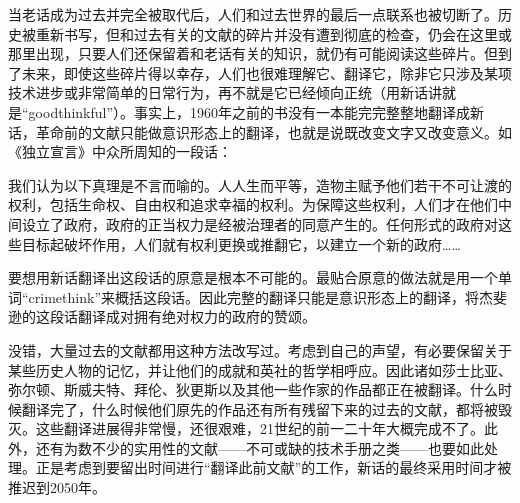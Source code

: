 当老话成为过去并完全被取代后，人们和过去世界的最后一点联系也被切断了。历史被重新书写，但和过去有关的文献的碎片并没有遭到彻底的检查，仍会在这里或那里出现，只要人们还保留着和老话有关的知识，就仍有可能阅读这些碎片。但到了未来，即使这些碎片得以幸存，人们也很难理解它、翻译它，除非它只涉及某项技术进步或非常简单的日常行为，再不就是它已经倾向正统（用新话讲就是``goodthinkful''）。事实上，1960年之前的书没有一本能完完整整地翻译成新话，革命前的文献只能做意识形态上的翻译，也就是说既改变文字又改变意义。如《独立宣言》中众所周知的一段话：

我们认为以下真理是不言而喻的。人人生而平等，造物主赋予他们若干不可让渡的权利，包括生命权、自由权和追求幸福的权利。为保障这些权利，人们才在他们中间设立了政府，政府的正当权力是经被治理者的同意产生的。任何形式的政府对这些目标起破坏作用，人们就有权利更换或推翻它，以建立一个新的政府\ldots\ldots{}

要想用新话翻译出这段话的原意是根本不可能的。最贴合原意的做法就是用一个单词``crimethink''来概括这段话。因此完整的翻译只能是意识形态上的翻译，将杰斐逊的这段话翻译成对拥有绝对权力的政府的赞颂。

没错，大量过去的文献都用这种方法改写过。考虑到自己的声望，有必要保留关于某些历史人物的记忆，并让他们的成就和英社的哲学相呼应。因此诸如莎士比亚、弥尔顿、斯威夫特、拜伦、狄更斯以及其他一些作家的作品都正在被翻译。什么时候翻译完了，什么时候他们原先的作品还有所有残留下来的过去的文献，都将被毁灭。这些翻译进展得非常慢，还很艰难，21世纪的前一二十年大概完成不了。此外，还有为数不少的实用性的文献——不可或缺的技术手册之类——也要如此处理。正是考虑到要留出时间进行``翻译此前文献''的工作，新话的最终采用时间才被推迟到2050年。
